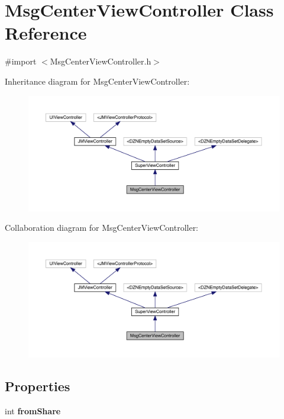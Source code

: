 \hypertarget{interface_msg_center_view_controller}{}\section{Msg\+Center\+View\+Controller Class Reference}
\label{interface_msg_center_view_controller}


{\ttfamily \#import $<$Msg\+Center\+View\+Controller.\+h$>$}



Inheritance diagram for Msg\+Center\+View\+Controller\+:\nopagebreak
\begin{figure}[H]
\begin{center}
\leavevmode
\includegraphics[width=350pt]{interface_msg_center_view_controller__inherit__graph}
\end{center}
\end{figure}


Collaboration diagram for Msg\+Center\+View\+Controller\+:\nopagebreak
\begin{figure}[H]
\begin{center}
\leavevmode
\includegraphics[width=350pt]{interface_msg_center_view_controller__coll__graph}
\end{center}
\end{figure}
\subsection*{Properties}
\begin{DoxyCompactItemize}
\item 
\mbox{\label{interface_msg_center_view_controller_a6e8ecab20ed52c864a336b08d1b6611c}} 
int {\bfseries from\+Share}
\end{DoxyCompactItemize}
